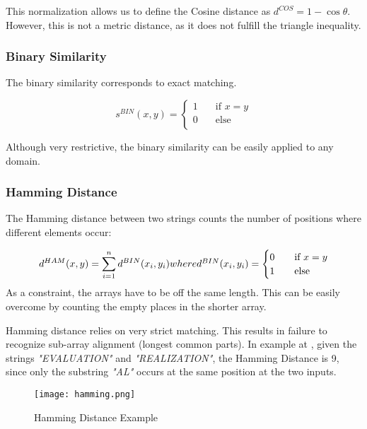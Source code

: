 This normalization allows us to define the Cosine distance as 
$d^{COS}=1 - \cos \theta$. 
However, this is not a metric distance, as it does not fulfill the triangle inequality.

\subsubsection{Binary Similarity}
The binary similarity corresponds to exact matching. 

\begin{equation}
s^{BIN}(x,y)=
\begin{cases}
1  & \quad \text{if } x=y \\
0  & \quad \text{else }\\
\end{cases}
\label{eq:binary} 
\end{equation}

Although very restrictive, the binary similarity can be easily applied to any domain. 
 
\subsubsection{Hamming Distance}
The Hamming distance between two strings counts the number of positions where different elements occur:

\begin{equation}
	d^{HAM}(x,y) = \sum_{i=1}^{n}d^{BIN}(x_{i},y_{i}) $$where$$ 
	d^{BIN}(x_{i},y_{i})=
	\begin{cases}
	0  & \quad \text{if } x=y \\
	1  & \quad \text{else }\\
	\end{cases}
\end{equation}
As a constraint, the arrays have to be off the same length. 
This can be easily overcome by counting the empty places in the shorter array. 

Hamming distance relies on very strict matching. This results in failure to recognize sub-array alignment (longest common parts). 
In example at , given the strings \emph{"EVALUATION"} and \emph{"REALIZATION"}, 
the Hamming Distance is 9, 
since only the substring \emph{"AL"} occurs at the same position at the two inputs.

\begin{figure}[ht]
	\centering
	\texttt{[image: hamming.png]}
	\caption{Hamming Distance Example} 
	\label{fig:hamming}
\end{figure}

